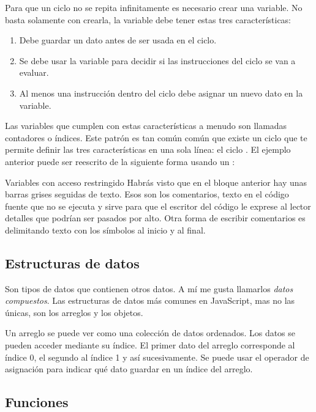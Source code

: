 \documentclass{article}
\newcommand{\code}[1]{\tcbox{\texttt{#1}}}
\newcommand{\codejs}[1]{\tcbox{\lstinline[style=ES6]{#1}}}
\begin{document}
Para que un ciclo no se repita infinitamente es necesario crear una variable. No basta solamente con crearla, la variable debe tener estas tres características:
\begin{enumerate}
  \item Debe guardar un dato antes de ser usada en el ciclo.
  \item Se debe usar la variable para decidir si las instrucciones del ciclo se van a evaluar.
  \item Al menos una instrucción dentro del ciclo debe asignar un nuevo dato en la variable.
\end{enumerate}
Las variables que cumplen con estas características a menudo son llamadas contadores o índices. Este patrón es tan común común que existe un ciclo que te permite definir las tres características en una sola línea: el ciclo \codejs{for}. El ejemplo anterior puede ser reescrito de la siguiente forma usando un \codejs{for}:

\begin{bclogo}[logo=\bcinfo, couleurBarre=orange, noborder=true, couleur=white]{Variables con acceso restringido}
Habrás visto que en el bloque anterior hay unas barras grises \code{//} seguidas de texto. Esos son los comentarios, texto en el código fuente que no se ejecuta y sirve para que el escritor del código le exprese al lector detalles que podrían ser pasados por alto.
\newline
Otra forma de escribir comentarios es delimitando texto con los símbolos \code{/*} al inicio y \code{*/} al final.
\end{bclogo}


\subsection{Estructuras de datos}
Son tipos de datos que contienen otros datos. A mí me gusta llamarlos \textit{datos compuestos}. Las estructuras de datos más comunes en JavaScript, mas no las únicas, son los arreglos y los objetos.

Un arreglo se puede ver como una colección de datos ordenados. Los datos se pueden acceder mediante su índice. El primer dato del arreglo corresponde al índice 0, el segundo al índice 1 y así sucesivamente. Se puede usar el operador de asignación \code{=} para indicar qué dato guardar en un índice del arreglo.


\subsection{Funciones}
\end{document}
